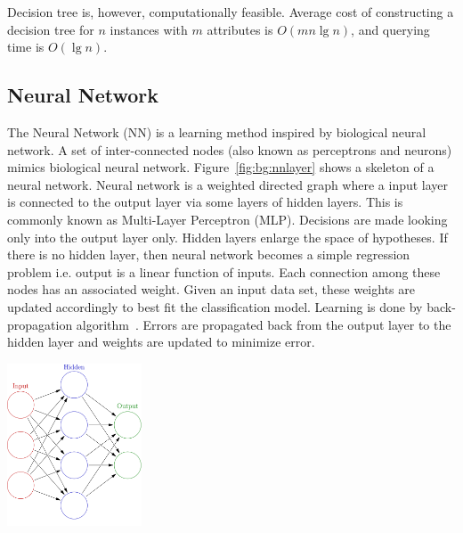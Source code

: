 Decision tree is, however, computationally feasible. Average cost of constructing a decision tree for $n$ instances with $m$ attributes is $O(mn \lg n)$, and querying time is $O(\lg n)$.

\subsection*{Neural Network}
The Neural Network (NN) is a learning method inspired by biological neural network. A set of inter-connected nodes (also known as perceptrons and neurons) mimics biological neural network. Figure~\ref{fig:bg:nnlayer} shows a skeleton of a neural network. Neural network is a weighted directed graph where a input layer is connected to the output layer via some layers of hidden layers. This is commonly known as Multi-Layer Perceptron (MLP). Decisions are made looking only into the output layer only. Hidden layers enlarge the space of hypotheses. If there is no hidden layer, then neural network becomes a simple regression problem i.e. output is a linear function of inputs. Each connection among these nodes has an associated weight. Given an input data set, these weights are updated accordingly to best fit the classification model. Learning is done by back-propagation algorithm~\cite{raul96:nn}. Errors are propagated back from the output layer to the hidden layer and weights are updated to minimize error.
    \begin{center}
        \includegraphics[width=4.0cm]{figs/nnlayers.png}
        \label{fig:bg:nnlayer}
    \end{center}

